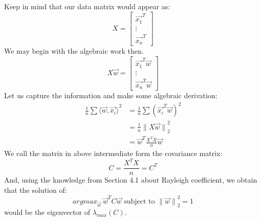 Keep in mind that our data matrix would appear as:
\[
    X = \begin{bmatrix} \vec{x_1}^T \\ \vdots \\ \vec{x_n}^T \end{bmatrix}
\]
We may begin with the algebraic work then.
\[
    X \vec{w} = \begin{bmatrix} \vec{x_1}^T \vec{w} \\ \vdots \\ \vec{x_n}^T \vec{w} \end{bmatrix}
\]
Let us capture the information and make some algebraic derivation:
\begin{align*}
    \frac{1}{n} \sum {\langle \vec{w}, \vec{x_i} \rangle}^2
    &= \frac{1}{n} \sum {(\vec{x_i}^T \vec{w})}^2 \\
    &= \frac{1}{n} {\lVert X \vec{w} \rVert}_2^2 \\
    &= \vec{w}^T \frac{X^T X}{n} \vec{w}
\end{align*}
We call the matrix in above intermediate form the covariance matrix:
\[
    C = \frac{X^T X}{n} = C^T
\]
And, using the knowledge from Section 4.1 about Rayleigh coefficient, we obtain that the solution of:
\[
    {argmax}_{\vec{w}} \ \vec{w}^T C \vec{w} \text{ subject to } {\lVert \vec{w} \rVert}_2^2 = 1
\]
would be the eigenvector of $\lambda_{max}(C)$.
